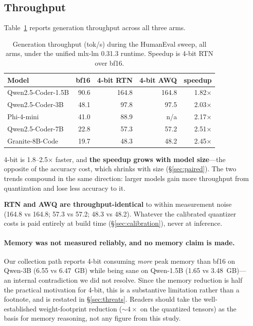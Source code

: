 \documentclass[11pt]{article}
\begin{document}
\subsection{Throughput}
\label{sec:throughput}

Table~\ref{tab:throughput} reports generation throughput across all three arms.

\begin{table}[h]
  \centering
  \caption{Generation throughput (tok/s) during the HumanEval sweep, all arms, under the
    unified mlx-lm 0.31.3 runtime. Speedup is 4-bit RTN over bf16.}
  \label{tab:throughput}
  \smallskip
  \begin{tabular}{lrrrr}
    \toprule
    Model & bf16 & 4-bit RTN & 4-bit AWQ & speedup \\
    \midrule
    Qwen2.5-Coder-1.5B & 90.6 & 164.8 & 164.8 & 1.82$\times$ \\
    Qwen2.5-Coder-3B   & 48.1 &  97.8 &  97.5 & 2.03$\times$ \\
    Phi-4-mini         & 41.0 &  88.9 & n/a   & 2.17$\times$ \\
    Qwen2.5-Coder-7B   & 22.8 &  57.3 &  57.2 & 2.51$\times$ \\
    Granite-8B-Code    & 19.7 &  48.3 &  48.2 & 2.45$\times$ \\
    \bottomrule
  \end{tabular}
\end{table}

4-bit is 1.8--2.5$\times$ faster, and \textbf{the speedup grows with model size}---the
opposite of the accuracy cost, which shrinks with size (\S\ref{sec:paired}). The two
trends compound in the same direction: larger models gain more throughput from
quantization and lose less accuracy to it.

\textbf{RTN and AWQ are throughput-identical} to within measurement noise (164.8 vs
164.8; 57.3 vs 57.2; 48.3 vs 48.2). Whatever the calibrated quantizer costs is paid
entirely at build time (\S\ref{sec:calibration}), never at inference.

\paragraph{Memory was not measured reliably, and no memory claim is made.} Our collection
path reports 4-bit consuming \emph{more} peak memory than bf16 on Qwen-3B (6.55 vs
6.47~GB) while being sane on Qwen-1.5B (1.65 vs 3.48~GB)---an internal contradiction we
did not resolve. Since the memory reduction is half the practical motivation for 4-bit,
this is a substantive limitation rather than a footnote, and is restated in
\S\ref{sec:threats}. Readers should take the well-established weight-footprint reduction
(${\sim}4\times$ on the quantized tensors) as the basis for memory reasoning, not any
figure from this study.
\end{document}
